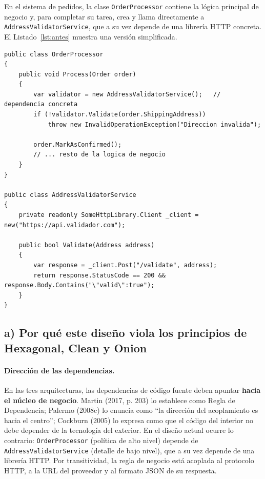 \documentclass[11pt,a4paper]{article}
\begin{document}
En el sistema de pedidos, la clase \texttt{OrderProcessor} contiene la lógica principal de negocio y, para completar su tarea, crea y llama directamente a \texttt{AddressValidatorService}, que a su vez depende de una librería HTTP concreta. El Listado~\ref{lst:antes} muestra una versión simplificada.

\begin{lstlisting}[caption={Diseño original: dependencia directa de una clase concreta.},label={lst:antes}]
public class OrderProcessor
{
    public void Process(Order order)
    {
        var validator = new AddressValidatorService();   // dependencia concreta
        if (!validator.Validate(order.ShippingAddress))
            throw new InvalidOperationException("Direccion invalida");

        order.MarkAsConfirmed();
        // ... resto de la logica de negocio
    }
}

public class AddressValidatorService
{
    private readonly SomeHttpLibrary.Client _client = new("https://api.validador.com");

    public bool Validate(Address address)
    {
        var response = _client.Post("/validate", address);
        return response.StatusCode == 200 && response.Body.Contains("\"valid\":true");
    }
}
\end{lstlisting}

\subsection{a) Por qué este diseño viola los principios de Hexagonal, Clean y Onion}

\paragraph{Dirección de las dependencias.} En las tres arquitecturas, las dependencias de código fuente deben apuntar \textbf{hacia el núcleo de negocio}. Martin (2017, p. 203) lo establece como Regla de Dependencia; Palermo (2008c) lo enuncia como ``la dirección del acoplamiento es hacia el centro''; Cockburn (2005) lo expresa como que el código del interior no debe depender de la tecnología del exterior. En el diseño actual ocurre lo contrario: \texttt{OrderProcessor} (política de alto nivel) depende de \texttt{AddressValidatorService} (detalle de bajo nivel), que a su vez depende de una librería HTTP. Por transitividad, la regla de negocio está acoplada al protocolo HTTP, a la URL del proveedor y al formato JSON de su respuesta.
\end{document}
